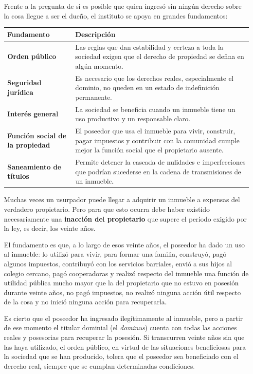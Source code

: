 \documentclass[12pt,oneside]{book}
\begin{document}
Frente a la pregunta de si es posible que quien ingresó sin ningún derecho sobre la cosa llegue a ser el dueño, el instituto se apoya en grandes fundamentos:

\begin{center}
\begin{tabularx}{\textwidth}{@{}>{\raggedright\arraybackslash}p{} >{\raggedright\arraybackslash}X@{}}
\toprule
\textbf{Fundamento} & \textbf{Descripción} \\
\midrule
\textbf{Orden público} & Las reglas que dan estabilidad y certeza a toda la sociedad exigen que el derecho de propiedad se defina en algún momento. \\
\textbf{Seguridad jurídica} & Es necesario que los derechos reales, especialmente el dominio, no queden en un estado de indefinición permanente. \\
\textbf{Interés general} & La sociedad se beneficia cuando un inmueble tiene un uso productivo y un responsable claro. \\
\textbf{Función social de la propiedad} & El poseedor que usa el inmueble para vivir, construir, pagar impuestos y contribuir con la comunidad cumple mejor la función social que el propietario ausente. \\
\textbf{Saneamiento de títulos} & Permite detener la cascada de nulidades e imperfecciones que podrían sucederse en la cadena de transmisiones de un inmueble. \\
\bottomrule
\end{tabularx}
\end{center}

Muchas veces un usurpador puede llegar a adquirir un inmueble a expensas del verdadero propietario. Pero para que esto ocurra debe haber existido necesariamente una \textbf{inacción del propietario} que supere el período exigido por la ley, es decir, los veinte años.

El fundamento es que, a lo largo de esos veinte años, el poseedor ha dado un uso al inmueble: lo utilizó para vivir, para formar una familia, construyó, pagó algunos impuestos, contribuyó con los servicios barriales, envió a sus hijos al colegio cercano, pagó cooperadoras y realizó respecto del inmueble una función de utilidad pública mucho mayor que la del propietario que no estuvo en posesión durante veinte años, no pagó impuestos, no realizó ninguna acción útil respecto de la cosa y no inició ninguna acción para recuperarla.

Es cierto que el poseedor ha ingresado ilegítimamente al inmueble, pero a partir de ese momento el titular dominial (el \textit{dominus}) cuenta con todas las acciones reales y posesorias para recuperar la posesión. Si transcurren veinte años sin que las haya utilizado, el orden público, en virtud de las situaciones beneficiosas para la sociedad que se han producido, tolera que el poseedor sea beneficiado con el derecho real, siempre que se cumplan determinadas condiciones.
\end{document}
